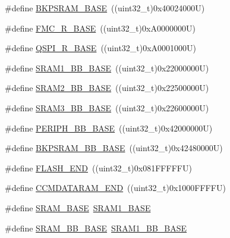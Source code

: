 \begin{DoxyCompactItemize}
\#define \hyperlink{group___peripheral__memory__map_ga52e57051bdf8909222b36e5408a48f32}{B\+K\+P\+S\+R\+A\+M\+\_\+\+B\+A\+SE}~((uint32\+\_\+t)0x40024000\+U)
\item 
\#define \hyperlink{group___peripheral__memory__map_ga7a599164cd92798542bc6288793d1ed5}{F\+M\+C\+\_\+\+R\+\_\+\+B\+A\+SE}~((uint32\+\_\+t)0x\+A0000000\+U)
\item 
\#define \hyperlink{group___peripheral__memory__map_ga3b6b7d9c67dec50557fd634505198e9d}{Q\+S\+P\+I\+\_\+\+R\+\_\+\+B\+A\+SE}~((uint32\+\_\+t)0x\+A0001000\+U)
\item 
\#define \hyperlink{group___peripheral__memory__map_gac4c4f61082e4b168f29d9cf97dc3ca5c}{S\+R\+A\+M1\+\_\+\+B\+B\+\_\+\+B\+A\+SE}~((uint32\+\_\+t)0x22000000\+U)
\item 
\#define \hyperlink{group___peripheral__memory__map_gac33cb6edadf184ab9860d77089503922}{S\+R\+A\+M2\+\_\+\+B\+B\+\_\+\+B\+A\+SE}~((uint32\+\_\+t)0x22500000\+U)
\item 
\#define \hyperlink{group___peripheral__memory__map_gaebfa4db60f9ac39c7c7f3fed98090410}{S\+R\+A\+M3\+\_\+\+B\+B\+\_\+\+B\+A\+SE}~((uint32\+\_\+t)0x22600000\+U)
\item 
\#define \hyperlink{group___peripheral__memory__map_gaed7efc100877000845c236ccdc9e144a}{P\+E\+R\+I\+P\+H\+\_\+\+B\+B\+\_\+\+B\+A\+SE}~((uint32\+\_\+t)0x42000000\+U)
\item 
\#define \hyperlink{group___peripheral__memory__map_gaee19a30c9fa326bb10b547e4eaf4e250}{B\+K\+P\+S\+R\+A\+M\+\_\+\+B\+B\+\_\+\+B\+A\+SE}~((uint32\+\_\+t)0x42480000\+U)
\item 
\#define \hyperlink{group___peripheral__memory__map_ga8be554f354e5aa65370f6db63d4f3ee4}{F\+L\+A\+S\+H\+\_\+\+E\+ND}~((uint32\+\_\+t)0x081\+F\+F\+F\+F\+F\+U)
\item 
\#define \hyperlink{group___peripheral__memory__map_ga9fbe263946209e6f09faf93512bd2f9a}{C\+C\+M\+D\+A\+T\+A\+R\+A\+M\+\_\+\+E\+ND}~((uint32\+\_\+t)0x1000\+F\+F\+F\+F\+U)
\item 
\#define \hyperlink{group___peripheral__memory__map_ga05e8f3d2e5868754a7cd88614955aecc}{S\+R\+A\+M\+\_\+\+B\+A\+SE}~\hyperlink{group___peripheral__memory__map_ga7d0fbfb8894012dbbb96754b95e562cd}{S\+R\+A\+M1\+\_\+\+B\+A\+SE}
\item 
\#define \hyperlink{group___peripheral__memory__map_gad3548b6e2f017f39d399358f3ac98454}{S\+R\+A\+M\+\_\+\+B\+B\+\_\+\+B\+A\+SE}~\hyperlink{group___peripheral__memory__map_gac4c4f61082e4b168f29d9cf97dc3ca5c}{S\+R\+A\+M1\+\_\+\+B\+B\+\_\+\+B\+A\+SE}
\item 

\end{DoxyCompactItemize}
